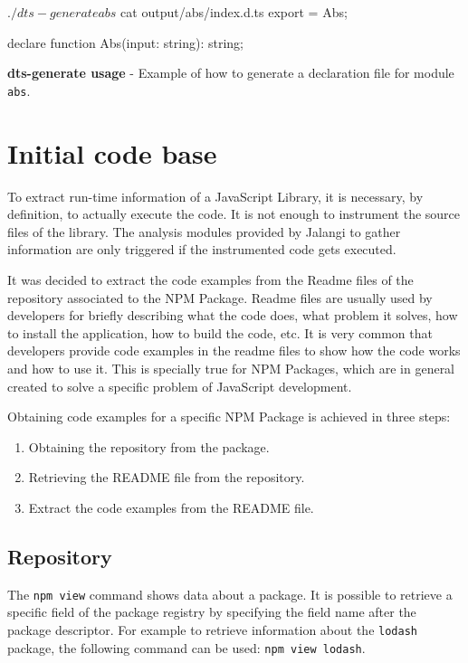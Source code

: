 \begin{code}
  \begin{bashinline}
$ ./dts-generate abs
$ cat output/abs/index.d.ts 
export = Abs;

declare function Abs(input: string): string;

    \end{bashinline}
  \caption[Declaration file generation example]{\textbf{dts-generate usage} - Example of how to generate a declaration file for module \texttt{abs}.}
  \label{code:dts-generate-example}
\end{code}

\section{Initial code base} \label{sec:initial-code-base}
To extract run-time information of a JavaScript Library, it is necessary, by definition, to actually execute the code. It is not enough to instrument the source files of the library. The analysis modules provided by Jalangi to gather information are only triggered if the instrumented code gets executed.

It was decided to extract the code examples from the Readme files of the repository associated to the NPM Package. Readme files are usually used by developers for briefly describing what the code does, what problem it solves, how to install the application, how to build the code, etc. It is very common that developers provide code examples in the readme files to show how the code works and how to use it. This is specially true for NPM Packages, which are in general created to solve a specific problem of JavaScript development.

Obtaining code examples for a specific NPM Package is achieved in three steps:
\begin{enumerate}
  \item Obtaining the repository from the package.
  \item Retrieving the README file from the repository.
  \item Extract the code examples from the README file.
\end{enumerate}

\subsection{Repository}
The \texttt{npm view} command shows data about a package. It is possible to retrieve a specific field of the package registry by specifying the field name after the package descriptor. For example to retrieve information about the \texttt{lodash} package, the following command can be used: \texttt{npm view lodash}.

